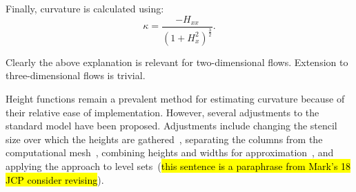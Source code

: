 \noindent Finally, curvature is calculated using:
\begin{equation}
\kappa = \frac{-H_{xx}}{(1+H_{x}^{2})^{\frac{3}{2}}}.
\label{eqn:kap}
\end{equation}

\noindent Clearly the above explanation is relevant for two-dimensional flows. Extension to three-dimensional flows is trivial.

Height functions remain a prevalent method for estimating curvature because of their relative ease of implementation. However, several adjustments to the standard model have been proposed. Adjustments include changing the stencil size over which the heights are gathered~\cite{1}, separating the columns from the computational mesh~\cite{2}, combining heights and widths for approximation~\cite{2}, and applying the approach to level sets~\cite{2}(\hl{this sentence is a paraphrase from Mark's 18 JCP consider revising}).

